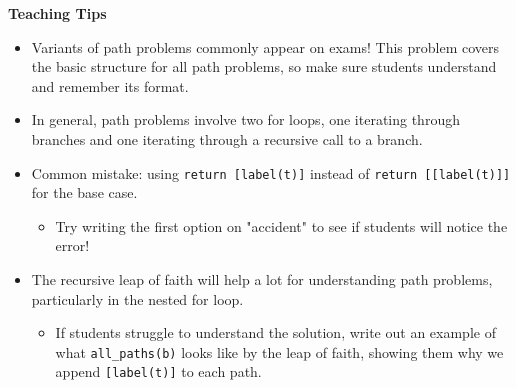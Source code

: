\begin{blocksection}
\begin{guide}
  \textbf{Teaching Tips}
  \begin{itemize}
      \item Variants of path problems commonly appear on exams! This problem covers the basic structure for all path problems, so make sure students understand and remember its format.
      \item In general, path problems involve two for loops, one iterating through branches and one iterating through a recursive call to a branch.
      \item Common mistake: using \lstinline$return [label(t)]$ instead of \lstinline$return [[label(t)]]$ for the base case.
      \begin{itemize}
          \item Try writing the first option on "accident" to see if students will notice the error!
      \end{itemize}
      \item The recursive leap of faith will help a lot for understanding path problems, particularly in the nested for loop.
      \begin{itemize}
        \item If students struggle to understand the solution, write out an example of what \lstinline$all_paths(b)$ looks like by the leap of faith, showing them why we append \lstinline$[label(t)]$ to each path.
      \end{itemize}
  \end{itemize}
\end{guide}
\end{blocksection}